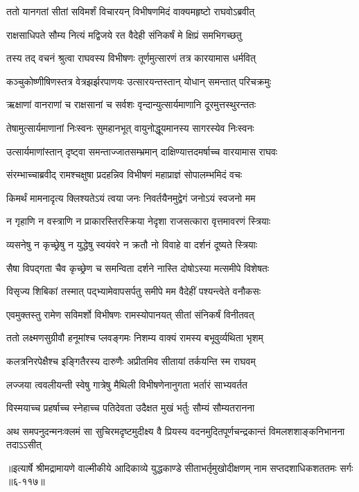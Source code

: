 \twolineshloka
{ततो यानगतां सीतां सविमर्शं विचारयन्}
{विभीषणमिदं वाक्यमहृष्टो राघवोऽब्रवीत्} %

\twolineshloka
{राक्षसाधिपते सौम्य नित्यं मद्विजये रत}
{वैदेही संनिकर्षं मे क्षिप्रं समभिगच्छतु} %

\twolineshloka
{तस्य तद् वचनं श्रुत्वा राघवस्य विभीषणः}
{तूर्णमुत्सारणं तत्र कारयामास धर्मवित्} %

\twolineshloka
{कञ्चुकोष्णीषिणस्तत्र वेत्रझर्झरपाणयः}
{उत्सारयन्तस्तान् योधान् समन्तात् परिचक्रमुः} %

\twolineshloka
{ऋक्षाणां वानराणां च राक्षसानां च सर्वशः}
{वृन्दान्युत्सार्यमाणानि दूरमुत्तस्थुरन्ततः} %

\twolineshloka
{तेषामुत्सार्यमाणानां निःस्वनः सुमहानभूत्}
{वायुनोद्धूयमानस्य सागरस्येव निःस्वनः} %

\twolineshloka
{उत्सार्यमाणांस्तान् दृष्ट्वा समन्ताज्जातसम्भ्रमान्}
{दाक्षिण्यात्तदमर्षाच्च वारयामास राघवः} %

\twolineshloka
{संरम्भाच्चाब्रवीद् रामश्चक्षुषा प्रदहन्निव}
{विभीषणं महाप्राज्ञं सोपालम्भमिदं वचः} %

\twolineshloka
{किमर्थं मामनादृत्य क्लिश्यतेऽयं त्वया जनः}
{निवर्तयैनमुद्वेगं जनोऽयं स्वजनो मम} %

\twolineshloka
{न गृहाणि न वस्त्राणि न प्राकारस्तिरस्क्रिया}
{नेदृशा राजसत्कारा वृत्तमावरणं स्त्रियाः} %

\twolineshloka
{व्यसनेषु न कृच्छ्रेषु न युद्धेषु स्वयंवरे}
{न क्रतौ नो विवाहे वा दर्शनं दूष्यते स्त्रियाः} %

\twolineshloka
{सैषा विपद्गता चैव कृच्छ्रेण च समन्विता}
{दर्शने नास्ति दोषोऽस्या मत्समीपे विशेषतः} %

\twolineshloka
{विसृज्य शिबिकां तस्मात् पद्भ्यामेवापसर्पतु}
{समीपे मम वैदेहीं पश्यन्त्वेते वनौकसः} %

\twolineshloka
{एवमुक्तस्तु रामेण सविमर्शो विभीषणः}
{रामस्योपानयत् सीतां संनिकर्षं विनीतवत्} %

\twolineshloka
{ततो लक्ष्मणसुग्रीवौ हनूमांश्च प्लवङ्गमः}
{निशम्य वाक्यं रामस्य बभूवुर्व्यथिता भृशम्} %

\twolineshloka
{कलत्रनिरपेक्षैश्च इङ्गितैरस्य दारुणैः}
{अप्रीतमिव सीतायां तर्कयन्ति स्म राघवम्} %

\twolineshloka
{लज्जया त्ववलीयन्ती स्वेषु गात्रेषु मैथिली}
{विभीषणेनानुगता भर्तारं साभ्यवर्तत} %

\twolineshloka
{विस्मयाच्च प्रहर्षाच्च स्नेहाच्च पतिदेवता}
{उदैक्षत मुखं भर्तुः सौम्यं सौम्यतरानना} %

\twolineshloka
{अथ समपनुदन्मनःक्लमं सा सुचिरमदृष्टमुदीक्ष्य वै प्रियस्य}
{वदनमुदितपूर्णचन्द्रकान्तं विमलशशाङ्कनिभानना तदाऽऽसीत्} %


॥इत्यार्षे श्रीमद्रामायणे वाल्मीकीये आदिकाव्ये युद्धकाण्डे सीताभर्तृमुखोदीक्षणम् नाम सप्तदशाधिकशततमः सर्गः ॥६-११७॥
